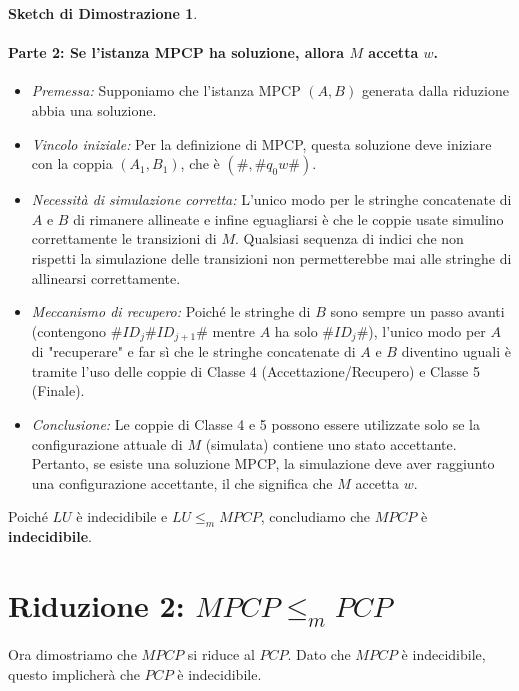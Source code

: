 \documentclass[a4paper]{article}
\theoremstyle{definition} %
\newtheorem{proof_sketch}{Sketch di Dimostrazione} %
\theoremstyle{remark} %
\begin{document}
\begin{proof_sketch}
\paragraph{Parte 2: Se l'istanza MPCP ha soluzione, allora $M$ accetta $w$.}

\begin{itemize}
    \item \emph{Premessa:} Supponiamo che l'istanza MPCP $(A, B)$ generata dalla riduzione abbia una soluzione.
    
    \item \emph{Vincolo iniziale:} Per la definizione di MPCP, questa soluzione deve iniziare con la coppia $(A_1, B_1)$, che è $(\#, \#q_0 w\#)$.
    
    \item \emph{Necessità di simulazione corretta:} L'unico modo per le stringhe concatenate di $A$ e $B$ di rimanere allineate e infine eguagliarsi è che le coppie usate simulino correttamente le transizioni di $M$. Qualsiasi sequenza di indici che non rispetti la simulazione delle transizioni non permetterebbe mai alle stringhe di allinearsi correttamente.
    
    \item \emph{Meccanismo di recupero:} Poiché le stringhe di $B$ sono sempre un passo avanti (contengono $\#ID_j\#ID_{j+1}\#$ mentre $A$ ha solo $\#ID_j\#$), l'unico modo per $A$ di "recuperare" e far sì che le stringhe concatenate di $A$ e $B$ diventino uguali è tramite l'uso delle coppie di Classe 4 (Accettazione/Recupero) e Classe 5 (Finale).
    
    \item \emph{Conclusione:} Le coppie di Classe 4 e 5 possono essere utilizzate solo se la configurazione attuale di $M$ (simulata) contiene uno stato accettante. Pertanto, se esiste una soluzione MPCP, la simulazione deve aver raggiunto una configurazione accettante, il che significa che $M$ accetta $w$.
\end{itemize}
\end{proof_sketch}

Poiché $LU$ è indecidibile e $LU \le_m MPCP$, concludiamo che $MPCP$ è \textbf{indecidibile}.

\section{Riduzione 2: $MPCP \le_m PCP$}

Ora dimostriamo che $MPCP$ si riduce al $PCP$. Dato che $MPCP$ è indecidibile, questo implicherà che $PCP$ è indecidibile.
\end{document}
